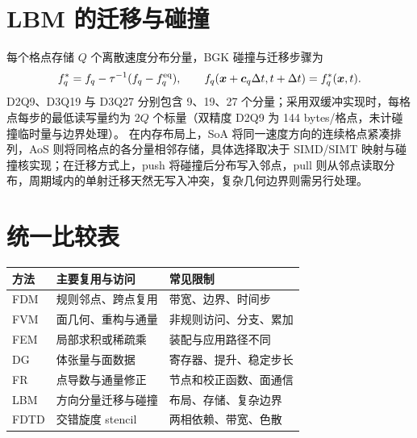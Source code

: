 \section{LBM 的迁移与碰撞}
每个格点存储 $Q$ 个离散速度分布分量，BGK 碰撞与迁移步骤为
\[
 f_q^*=f_q-\tau^{-1}(f_q-f_q^{\rm eq}),\qquad
 f_q(\bm x+\bm c_q\Delta t,t+\Delta t)=f_q^*(\bm x,t).
\]
D2Q9、D3Q19 与 D3Q27 分别包含 9、19、27 个分量；采用双缓冲实现时，每格点每步的最低读写量约为 $2Q$ 个标量（双精度 D2Q9 为 144 bytes/格点，未计碰撞临时量与边界处理）。
在内存布局上，SoA 将同一速度方向的连续格点紧凑排列，AoS 则将同格点的各分量相邻存储，具体选择取决于 SIMD/SIMT 映射与碰撞核实现；在迁移方式上，push 将碰撞后分布写入邻点，pull 则从邻点读取分布，周期域内的单射迁移天然无写入冲突，复杂几何边界则需另行处理。
\section{统一比较表}
\begin{center}\small
\begin{tabularx}{\textwidth}{lXX}
\toprule 方法&主要复用与访问&常见限制\\\midrule
FDM&规则邻点、跨点复用&带宽、边界、时间步\\
FVM&面几何、重构与通量&非规则访问、分支、累加\\
FEM&局部求积或稀疏乘&装配与应用路径不同\\
DG&体张量与面数据&寄存器、提升、稳定步长\\
FR&点导数与通量修正&节点和校正函数、面通信\\
LBM&方向分量迁移与碰撞&布局、存储、复杂边界\\
FDTD&交错旋度 stencil&两相依赖、带宽、色散\\\bottomrule
\end{tabularx}
\end{center}
